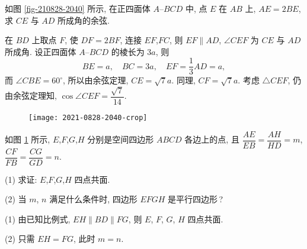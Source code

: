 \begin{exercise}
    如图 \ref{fig-210828-2040} 所示, 在正四面体 $A\text{--}BCD$ 中, 点 $E$ 在 $AB$ 上, $AE=2BE$, 求 $CE$ 与 $AD$ 所成角的余弦.
\end{exercise}
\beginsolution
    在 $BD$ 上取点 $F$, 使 $DF= 2BF$, 连接 $EF$,$FC$, 则 $EF\parallel AD$, $\angle CEF$ 为 $CE$ 与 $AD$ 所成角. 设正四面体 $A\text{--}BCD$ 的棱长为 $3a$, 则 
    \[BE= a,\quad BC= 3a,\quad EF=\dfrac13 AD= a,\]
    而 $\angle CBE= 60^\circ$, 所以由余弦定理, $CE=\sqrt7a$. 同理, $CF= \sqrt7a$. 考虑 $\triangle CEF$, 仍由余弦定理知, $\cos\angle CEF= \dfrac{\sqrt7}{14}$.
\endsolution

    \begin{figure}[htb]
    \small
    \centering
    \begin{minipage}[b]{0.45\linewidth}
      \centering
      \texttt{[image: 2021-0828-2040-crop]}
      \caption{}\label{fig-210828-2040}
    \end{minipage}
    \hskip 0.5cm  
    \begin{minipage}[b]{0.45\linewidth}
      \centering
      \caption{}\label{fig-190629-2020}
    \end{minipage}
    \end{figure}
    
\begin{exercise}
    如图 \ref{fig-190629-2020} 所示, $E$,$F$,$G$,$H$ 分别是空间四边形 $ABCD$ 各边上的点, 且 $\dfrac{AE}{EB}= \dfrac{AH}{HD}=m$, $\dfrac{CF}{FB}= \dfrac{CG}{GD}=n$.
    
    (1) 求证: $E$,$F$,$G$,$H$ 四点共面.
    
    (2) 当 $m$, $n$ 满足什么条件时, 四边形 $EFGH$ 是平行四边形\,?
\end{exercise}
\beginsolution
    (1) 由已知比例式, $EH\parallel BD\parallel FG$, 则 $E$, $F$, $G$, $H$ 四点共面.

    (2) 只需 $EH= FG$, 此时 $m=n$.
\endsolution